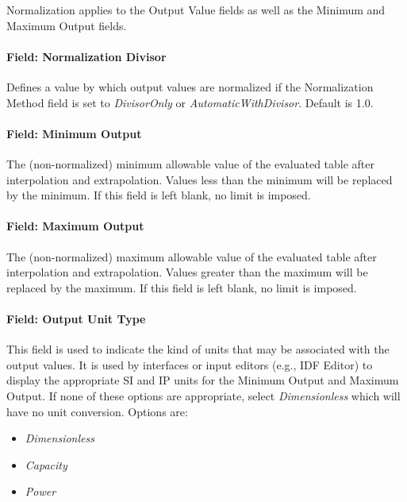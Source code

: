 Normalization applies to the Output Value fields as well as the Minimum
and Maximum Output fields.

\paragraph{Field: Normalization Divisor}\label{field-normalization-divisor}

Defines a value by which output values are normalized if the Normalization Method
field is set to \emph{DivisorOnly} or \emph{AutomaticWithDivisor}. Default is 1.0.

\paragraph{Field: Minimum Output}\label{field-minimum-output}

The (non-normalized) minimum allowable value of the evaluated table after interpolation
and extrapolation. Values less than the minimum will be replaced by the
minimum. If this field is left blank, no limit is imposed.

\paragraph{Field: Maximum Output}\label{field-maximum-output}

The (non-normalized) maximum allowable value of the evaluated table after interpolation
and extrapolation. Values greater than the maximum will be replaced by
the maximum. If this field is left blank, no limit is imposed.

\paragraph{Field: Output Unit Type}

This field is used to indicate the kind of units that may be associated
with the output values. It is used by interfaces or input editors (e.g., IDF Editor) to display the
appropriate SI and IP units for the Minimum Output and Maximum Output.
If none of these options are appropriate, select \emph{Dimensionless}
which will have no unit conversion. Options are:

\begin{itemize}
  \tightlist
  \item
  \emph{Dimensionless}
  \item
  \emph{Capacity}
  \item
  \emph{Power}
\end{itemize}

